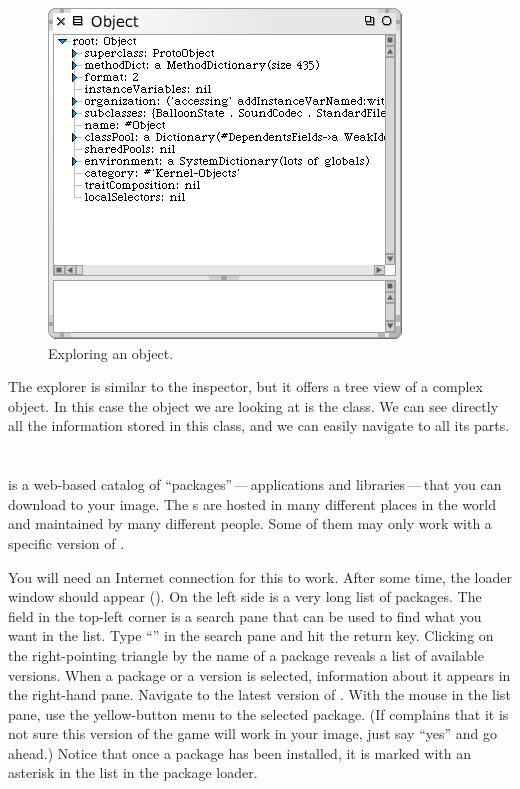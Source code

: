 \documentclass[a4paper,10pt,twoside]{book}
\begin{document}
\begin{figure}[htb]
\centerline {\includegraphics[scale=0.7]{ExploreIt}}
\caption{Exploring an object. \label{fig:exploreit}}
\end{figure}

The explorer is similar to the inspector, but it offers a tree view of a complex object.
In this case the object we are looking at is the  class.
We can see directly all the information stored in this class, and we can easily navigate to all its parts.

\section{\sqmap}

\sqmap is a web-based catalog of ``packages''\,---\,applications and libraries\,---\,that you can download to your image.
The s are hosted in many different places in the world and maintained by many different people. Some of them may only work with a specific version of \sq.

You will need an Internet connection for this to work.  After some time, the \sqmap loader window should appear ().
On the left side is a very long list of packages.
The field in the top-left corner is a search pane that can be used to find what you want in the list.
Type ``'' in the search pane and hit the return key.
Clicking on the right-pointing triangle by the name of a package reveals a list of available versions. When a package or a version is selected, information about it appears in the right-hand pane.
Navigate to the latest version of .
With the mouse in the list pane, use the yellow-button menu to  the selected package.
(If \sq complains that it is not sure this version of the game will work in your image, just say ``yes'' and go ahead.)
Notice that once a package has been installed, it is marked with an asterisk in the list in the \sqmap package loader. 
\end{document}

